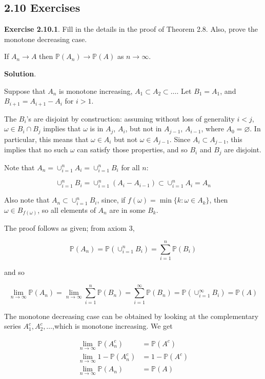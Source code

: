 \subsection{2.10 Exercises}\label{exercises}

\textbf{Exercise 2.10.1}. Fill in the details in the proof of Theorem
2.8. Also, prove the monotone decreasing case.

If \(A_n \rightarrow A\) then
\(\mathbb{P}(A_n) \rightarrow \mathbb{P}(A)\) as
\(n \rightarrow \infty\).

\textbf{Solution}.

Suppose that \(A_n\) is monotone increasing,
\(A_1 \subset A_2 \subset \dots\). Let \(B_1 = A_1\), and
\(B_{i+1} = A_{i+1} - A_i\) for \(i > 1\).

The \(B_i\)'s are disjoint by construction: assuming without loss of
generality \(i < j\), \(\omega \in B_i \cap B_j\) implies that
\(\omega\) is in \(A_j\), \(A_i\), but not in \(A_{j - 1}\),
\(A_{i - 1}\), where \(A_0 = \varnothing\). In particular, this means
that \(\omega \in A_{i}\) but not \(\omega \in A_{j - 1}\). Since
\(A_i \subset A_{j - 1}\), this implies that no such \(\omega\) can
satisfy those properties, and so \(B_i\) and \(B_j\) are disjoint.

Note that \(A_n = \cup_{i=1}^n A_i = \cup_{i=1}^n B_i\) for all \(n\):

\[ \cup_{i=1}^n B_i = \cup_{i=1}^n (A_i - A_{i - 1}) \subset \cup_{i=1}^n A_i = A_n \]

Also note that \(A_n \subset \cup_{i=1}^n B_i\), since, if
\(f(\omega) = \min \{ k : \omega \in A_k \}\), then
\(\omega \in B_{f(\omega)}\), so all elements of \(A_n\) are in some
\(B_k\).

The proof follows as given; from axiom 3,

\[ \mathbb{P}(A_n) = \mathbb{P}\left( \cup_{i=1}^n B_i \right) = \sum_{i=1}^n \mathbb{P}(B_i) \]

and so

\[ \lim_{n \rightarrow \infty} \mathbb{P}(A_n) = \lim_{n \rightarrow \infty} \sum_{i=1}^n \mathbb{P}(B_n) = \sum_{i=1}^\infty \mathbb{P}(B_n) = \mathbb{P}\left( \cup_{i=1}^\infty B_i \right) = \mathbb{P}(A) \]

The monotone decreasing case can be obtained by looking at the
complementary series \(A_1^c, A_2^c, \dots\),which is monotone
increasing. We get

\begin{align}
\lim_{n \rightarrow \infty} \mathbb{P}(A_n^c) &= \mathbb{P}(A^c) \\
\lim_{n \rightarrow \infty} 1 - \mathbb{P}(A_n^c) &= 1 - \mathbb{P}(A^c) \\
\lim_{n \rightarrow \infty} \mathbb{P}(A_n) &= \mathbb{P}(A)
\end{align}

